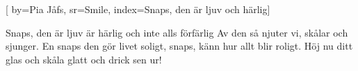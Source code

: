 
[
	by={Pia Jåfs},
	sr={Smile},
	index={Snaps, den är ljuv och härlig}]

\beginverse*
Snaps, den är ljuv är härlig
och inte alls förfärlig
Av den så njuter vi,
skålar och sjunger.
En snaps den gör livet soligt,
snaps, känn hur allt blir roligt.
Höj nu ditt glas och skåla glatt
och drick sen ur!
\endverse
\endsong